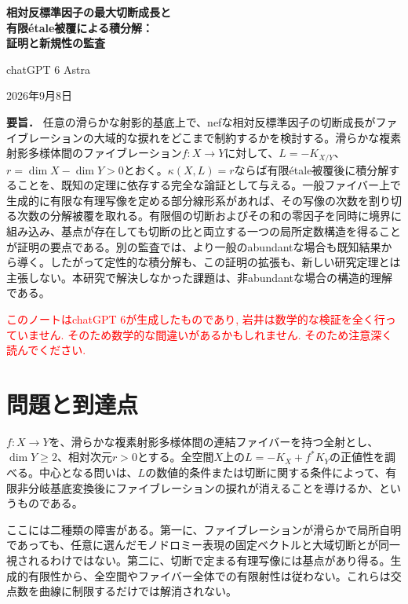 \documentclass[12pt]{amsart}
\theoremstyle{definition}
\theoremstyle{remark}
\numberwithin{equation}{section}
\newcommand{\xr}[1]{\textcolor{red}{#1}}
\begin{document}
\newpage
\setcounter{section}{0}
\setcounter{equation}{0}
\setcounter{thm}{0}
\renewcommand{\thesection}{J.\arabic{section}}
\renewcommand{\theHsection}{J.\arabic{section}}
\renewcommand{\proofname}{証明}
\renewcommand{\refname}{参考文献（日本語版）}
\begin{center}
{\Large\bfseries 相対反標準因子の最大切断成長と\\有限étale被覆による積分解：\\証明と新規性の監査}\par\medskip
{\large chatGPT 6 Astra}\par\smallskip
2026年9月8日
\end{center}
\medskip
\noindent\textbf{要旨．}
任意の滑らかな射影的基底上で、nefな相対反標準因子の切断成長がファイブレーションの大域的な捩れをどこまで制約するかを検討する。滑らかな複素射影多様体間のファイブレーション$f:X\to Y$に対して、$L=-K_{X/Y}$、$r=\dim X-\dim Y>0$とおく。$\kappa(X,L)=r$ならば有限étale被覆後に積分解することを、既知の定理に依存する完全な論証として与える。一般ファイバー上で生成的に有限な有理写像を定める部分線形系があれば、その写像の次数を割り切る次数の分解被覆を取れる。有限個の切断およびその和の零因子を同時に境界に組み込み、基点が存在しても切断の比と両立する一つの局所定数構造を得ることが証明の要点である。別の監査では、より一般のabundantな場合も既知結果から導く。したがって定性的な積分解も、この証明の拡張も、新しい研究定理とは主張しない。本研究で解決しなかった課題は、非abundantな場合の構造的理解である。
\par\medskip
\xr{このノートはchatGPT 6が生成したものであり, 岩井は数学的な検証を全く行っていません. そのため数学的な間違いがあるかもしれません. そのため注意深く読んでください.}

\section{問題と到達点}\label{ja:intro}
$f:X\to Y$を、滑らかな複素射影多様体間の連結ファイバーを持つ全射とし、$\dim Y\geq2$、相対次元$r>0$とする。全空間$X$上の$L=-K_X+f^*K_Y$の正値性を調べる。中心となる問いは、$L$の数値的条件または切断に関する条件によって、有限非分岐基底変換後にファイブレーションの捩れが消えることを導けるか、というものである。

ここには二種類の障害がある。第一に、ファイブレーションが滑らかで局所自明であっても、任意に選んだモノドロミー表現の固定ベクトルと大域切断とが同一視されるわけではない。第二に、切断で定まる有理写像には基点があり得る。生成的有限性から、全空間やファイバー全体での有限射性は従わない。これらは交点数を曲線に制限するだけでは解消されない。
\end{document}
